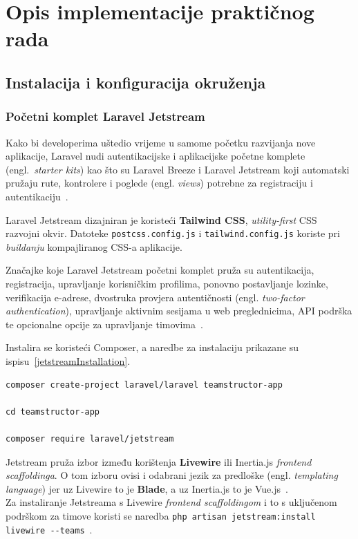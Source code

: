 \section{Opis implementacije praktičnog rada}

\subsection{Instalacija i konfiguracija okruženja}

\subsubsection{Početni komplet Laravel Jetstream}
Kako bi developerima uštedio vrijeme u samome početku razvijanja nove aplikacije, Laravel nudi autentikacijske i aplikacijske početne komplete (engl.~\textit{starter kits}) kao što su Laravel Breeze i Laravel Jetstream koji automatski pružaju rute, kontrolere i poglede (engl. \textit{views}) potrebne za registraciju i autentikaciju~\cite{starterKits}.

Laravel Jetstream dizajniran je koristeći \textbf{Tailwind CSS}, \textit{utility-first} CSS razvojni okvir. Datoteke \texttt{postcss.config.js} i \texttt{tailwind.config.js} koriste pri \textit{buildanju} kompajliranog CSS-a aplikacije.

Značajke koje Laravel Jetstream početni komplet pruža su autentikacija, registracija, upravljanje korisničkim profilima, ponovno postavljanje lozinke, verifikacija e-adrese, dvostruka provjera autentičnosti (engl. \textit{two-factor authentication}), upravljanje aktivnim sesijama u web preglednicima, API podrška te opcionalne opcije za upravljanje timovima~\cite{jetstreamIntro}.

Instalira se koristeći Composer, a naredbe za instalaciju prikazane su ispisu~\ref{jetstreamInstallation}.

\begin{lstlisting}[caption={Naredbe za instalaciju Jetstream paketa u novi Laravel projekt}, label=jetstreamInstallation]
composer create-project laravel/laravel teamstructor-app

cd teamstructor-app

composer require laravel/jetstream
\end{lstlisting}

Jetstream pruža izbor između korištenja \textbf{Livewire} ili Inertia.js \textit{frontend scaffoldinga}. O tom izboru ovisi i odabrani jezik za predloške (engl. \textit{templating language}) jer uz Livewire to je \textbf{Blade}, a uz Inertia.js to je Vue.js~\cite{jetstreamIntro}. \\ Za instaliranje Jetstreama s Livewire \textit{frontend scaffoldingom} i to s uključenom podrškom za timove koristi se naredba \texttt{php artisan jetstream:install livewire -{}-teams}~\cite{jetstreamInstallation}.

